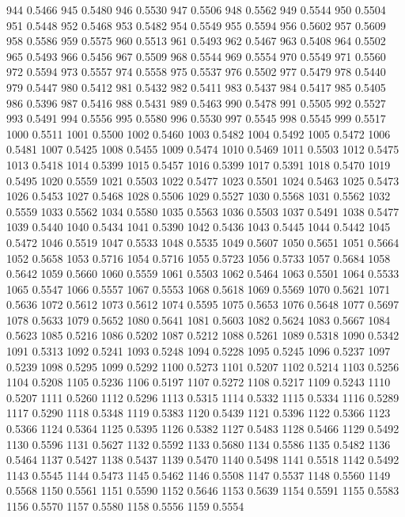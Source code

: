 944 0.5466
945 0.5480
946 0.5530
947 0.5506
948 0.5562
949 0.5544
950 0.5504
951 0.5448
952 0.5468
953 0.5482
954 0.5549
955 0.5594
956 0.5602
957 0.5609
958 0.5586
959 0.5575
960 0.5513
961 0.5493
962 0.5467
963 0.5408
964 0.5502
965 0.5493
966 0.5456
967 0.5509
968 0.5544
969 0.5554
970 0.5549
971 0.5560
972 0.5594
973 0.5557
974 0.5558
975 0.5537
976 0.5502
977 0.5479
978 0.5440
979 0.5447
980 0.5412
981 0.5432
982 0.5411
983 0.5437
984 0.5417
985 0.5405
986 0.5396
987 0.5416
988 0.5431
989 0.5463
990 0.5478
991 0.5505
992 0.5527
993 0.5491
994 0.5556
995 0.5580
996 0.5530
997 0.5545
998 0.5545
999 0.5517
1000 0.5511
1001 0.5500
1002 0.5460
1003 0.5482
1004 0.5492
1005 0.5472
1006 0.5481
1007 0.5425
1008 0.5455
1009 0.5474
1010 0.5469
1011 0.5503
1012 0.5475
1013 0.5418
1014 0.5399
1015 0.5457
1016 0.5399
1017 0.5391
1018 0.5470
1019 0.5495
1020 0.5559
1021 0.5503
1022 0.5477
1023 0.5501
1024 0.5463
1025 0.5473
1026 0.5453
1027 0.5468
1028 0.5506
1029 0.5527
1030 0.5568
1031 0.5562
1032 0.5559
1033 0.5562
1034 0.5580
1035 0.5563
1036 0.5503
1037 0.5491
1038 0.5477
1039 0.5440
1040 0.5434
1041 0.5390
1042 0.5436
1043 0.5445
1044 0.5442
1045 0.5472
1046 0.5519
1047 0.5533
1048 0.5535
1049 0.5607
1050 0.5651
1051 0.5664
1052 0.5658
1053 0.5716
1054 0.5716
1055 0.5723
1056 0.5733
1057 0.5684
1058 0.5642
1059 0.5660
1060 0.5559
1061 0.5503
1062 0.5464
1063 0.5501
1064 0.5533
1065 0.5547
1066 0.5557
1067 0.5553
1068 0.5618
1069 0.5569
1070 0.5621
1071 0.5636
1072 0.5612
1073 0.5612
1074 0.5595
1075 0.5653
1076 0.5648
1077 0.5697
1078 0.5633
1079 0.5652
1080 0.5641
1081 0.5603
1082 0.5624
1083 0.5667
1084 0.5623
1085 0.5216
1086 0.5202
1087 0.5212
1088 0.5261
1089 0.5318
1090 0.5342
1091 0.5313
1092 0.5241
1093 0.5248
1094 0.5228
1095 0.5245
1096 0.5237
1097 0.5239
1098 0.5295
1099 0.5292
1100 0.5273
1101 0.5207
1102 0.5214
1103 0.5256
1104 0.5208
1105 0.5236
1106 0.5197
1107 0.5272
1108 0.5217
1109 0.5243
1110 0.5207
1111 0.5260
1112 0.5296
1113 0.5315
1114 0.5332
1115 0.5334
1116 0.5289
1117 0.5290
1118 0.5348
1119 0.5383
1120 0.5439
1121 0.5396
1122 0.5366
1123 0.5366
1124 0.5364
1125 0.5395
1126 0.5382
1127 0.5483
1128 0.5466
1129 0.5492
1130 0.5596
1131 0.5627
1132 0.5592
1133 0.5680
1134 0.5586
1135 0.5482
1136 0.5464
1137 0.5427
1138 0.5437
1139 0.5470
1140 0.5498
1141 0.5518
1142 0.5492
1143 0.5545
1144 0.5473
1145 0.5462
1146 0.5508
1147 0.5537
1148 0.5560
1149 0.5568
1150 0.5561
1151 0.5590
1152 0.5646
1153 0.5639
1154 0.5591
1155 0.5583
1156 0.5570
1157 0.5580
1158 0.5556
1159 0.5554
